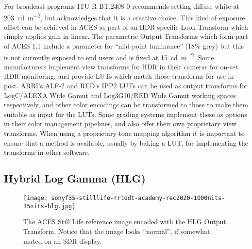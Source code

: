For broadcast programs ITU-R BT.2408-0 recommends setting diffuse white at \SI{203}{\candela\per\metre\squared}, but acknowledges that it is a creative choice.
This kind of exposure offset can be achieved in ACES as part of an HDR specific Look Transform which simply applies gain in linear.
The parametric Output Transforms which form part of ACES 1.1 include a parameter for ``mid-point luminance'' (18\% grey) but this is not currently exposed to end users and is fixed at \SI{15}{\candela\per\metre\squared}.
\ccPar{}
Some manufacturers implement view transforms for HDR in their cameras for on-set HDR monitoring, and provide LUTs which match those transforms for use in post.
ARRI's ALF-2 and RED's IPP2 LUTs can be used as output transforms for LogC/ALEXA Wide Gamut and Log3G10/RED Wide Gamut working spaces respectively, and other color encodings can be transformed to those to make them suitable as input for the LUTs.
Some grading systems implement these as options in their color management pipelines, and also offer their own proprietary view transforms.
When using a proprietary tone mapping algorithm it is important to ensure that a method is available, usually by baking a LUT, for implementing the transforms in other software.

\subsection{Hybrid Log Gamma (HLG)}%
\label{subsec:hybrid-log-gamma-hlg}

\begin{figure}[H]
    \texttt{[image: sonyf35-stilllife-rrtodt-academy-rec2020-1000nits-15nits-hlg.jpg]}
    \caption{
        The ACES Still Life reference image encoded with the HLG Output Transform.\newline
        Notice that the image looks ``normal'', if somewhat muted on an SDR display.\newline
        \ccCopyrightAmpas
    }%
    \label{fig:ot-academy-hlg-1000nits}
\end{figure}

